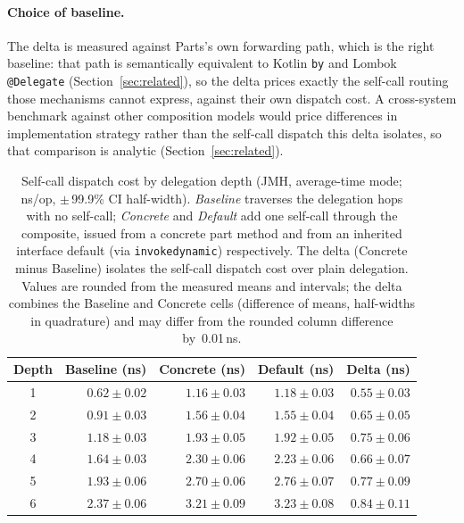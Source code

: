 \documentclass[sigplan,10pt,review,anonymous]{acmart}
\theoremstyle{acmplain}
\newcommand{\code}[1]{\texttt{#1}}
\begin{document}
\paragraph{Choice of baseline.}
The delta is measured against Parts's own forwarding path, which is the right
baseline: that path is semantically equivalent to Kotlin \code{by} and Lombok
\code{@Delegate} (Section~\ref{sec:related}), so the delta prices exactly the
self-call routing those mechanisms cannot express, against their own dispatch
cost. A cross-system benchmark against other composition models would price
differences in implementation strategy rather than the self-call dispatch this
delta isolates, so that comparison is analytic (Section~\ref{sec:related}).

\begin{table}[htbp]
\centering
\caption{Self-call dispatch cost by delegation depth (JMH, average-time mode; ns/op, $\pm$\,99.9\% CI half-width). \emph{Baseline} traverses the delegation hops with no self-call; \emph{Concrete} and \emph{Default} add one self-call through the composite, issued from a concrete part method and from an inherited interface default (via \code{invokedynamic}) respectively. The delta (Concrete minus Baseline) isolates the self-call dispatch cost over plain delegation. Values are rounded from the measured means and intervals; the delta combines the Baseline and Concrete cells (difference of means, half-widths in quadrature) and may differ from the rounded column difference by~0.01\,ns.}
\label{tab:bench}
{\small
\begin{tabular}{crrrr}
\toprule
Depth & Baseline (ns) & Concrete (ns) & Default (ns) & Delta (ns) \\
\midrule
1 & $0.62 \pm 0.02$ & $1.16 \pm 0.03$ & $1.18 \pm 0.03$ & $0.55 \pm 0.03$ \\
2 & $0.91 \pm 0.03$ & $1.56 \pm 0.04$ & $1.55 \pm 0.04$ & $0.65 \pm 0.05$ \\
3 & $1.18 \pm 0.03$ & $1.93 \pm 0.05$ & $1.92 \pm 0.05$ & $0.75 \pm 0.06$ \\
4 & $1.64 \pm 0.03$ & $2.30 \pm 0.06$ & $2.23 \pm 0.06$ & $0.66 \pm 0.07$ \\
5 & $1.93 \pm 0.06$ & $2.70 \pm 0.06$ & $2.76 \pm 0.07$ & $0.77 \pm 0.09$ \\
6 & $2.37 \pm 0.06$ & $3.21 \pm 0.09$ & $3.23 \pm 0.08$ & $0.84 \pm 0.11$ \\
\bottomrule
\end{tabular}
}
\end{table}
\end{document}
